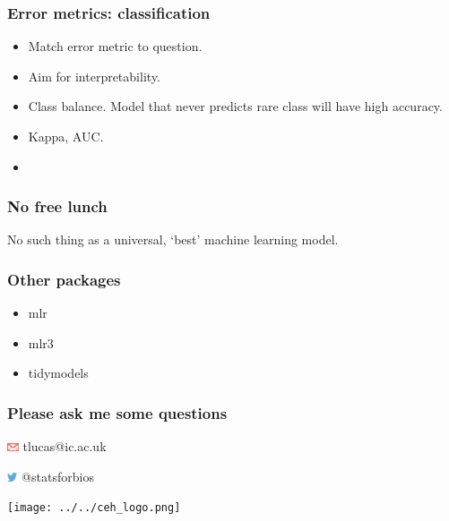 \documentclass[handout, aspectratio = 169]{beamer}
\begin{document}
\begin{frame}
\frametitle{Error metrics: classification}

\begin{itemize}
\item Match error metric to question.
\item Aim for interpretability.
\item Class balance. Model that never predicts rare class will have high accuracy.
\item Kappa, AUC.
\item 
\end{itemize}
\end{frame} 



\begin{frame}
\frametitle{No free lunch}
No such thing as a universal, `best' machine learning model.
\end{frame} 













 




 















\begin{frame}
\frametitle{Other packages}
\begin{itemize}
\item mlr
\item mlr3
\item tidymodels
\end{itemize}

\end{frame} 


    
\begin{frame}

\frametitle{Please ask me some questions}

\vspace{5mm}


\vspace{4mm}

\includegraphics[height=7pt]{Ar_Icon_Contact.pdf} tlucas{\footnotesize{@}}ic.ac.uk

\includegraphics[height=7pt]{Twitter_logo_blue-small.png} {\footnotesize{@}}statsforbios

\vspace{2cm}
\hfill %
\texttt{[image: ../../ceh\_logo.png]}

\end{frame}




 
\end{document}

